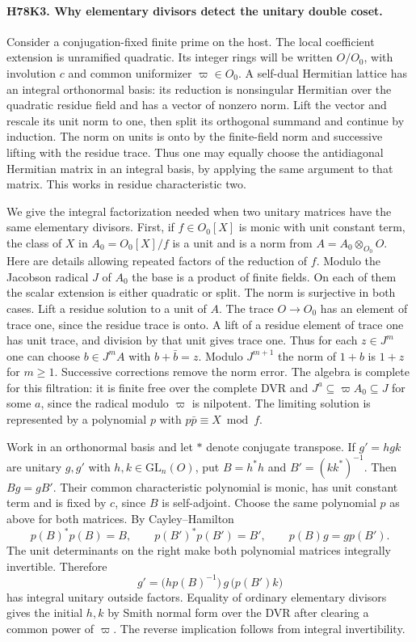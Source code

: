 \paragraph{H78K3. Why elementary divisors detect the unitary double coset.}
Consider a conjugation-fixed finite prime on the host. The local
coefficient extension is unramified quadratic. Its integer rings
will be written $O/O_0$, with involution $c$ and common uniformizer
$\varpi\in O_0$. A self-dual Hermitian lattice has an integral
orthonormal basis: its reduction is nonsingular Hermitian over
the quadratic residue field and has a vector of nonzero norm.
Lift the vector and rescale its unit norm to one, then split its
orthogonal summand and continue by induction. The norm on units
is onto by the finite-field norm and successive lifting with the
residue trace. Thus one may equally choose the antidiagonal
Hermitian matrix in an integral basis, by applying the same argument
to that matrix. This works in residue characteristic two.

We give the integral factorization needed when two unitary matrices
have the same elementary divisors. First, if $f\in O_0[X]$ is monic
with unit constant term, the class of $X$ in $A_0=O_0[X]/f$ is
a unit and is a norm from $A=A_0\otimes_{O_0}O$. Here are details
allowing repeated factors of the reduction of $f$. Modulo the
Jacobson radical $J$ of $A_0$ the base is a product of finite fields.
On each of them the scalar extension is either quadratic or split.
The norm is surjective in both cases. Lift a residue solution to a
unit of $A$. The trace $O\to O_0$ has an element of trace one,
since the residue trace is onto. A lift of a residue element of trace
one has unit trace, and division by that unit gives trace one. Thus for each $z\in J^m$ one can choose
$b\in J^m A$ with $b+\bar b=z$. Modulo $J^{m+1}$ the norm
of $1+b$ is $1+z$ for $m\ge1$. Successive corrections remove the
norm error. The algebra is complete for this filtration: it is
finite free over the complete DVR and $J^a\subseteq\varpi A_0
\subseteq J$ for some $a$, since the radical modulo $\varpi$
is nilpotent. The limiting solution is represented by a polynomial
$p$ with $p\bar p\equiv X\bmod f$.

Work in an orthonormal basis and let $*$ denote conjugate transpose.
If $g'=hgk$ are unitary $g,g'$ with $h,k\in\mathrm{GL}_n(O)$,
put $B=h^*h$ and $B'=(kk^*)^{-1}$. Then $Bg=gB'$.
Their common characteristic polynomial is monic, has unit constant
term and is fixed by $c$, since $B$ is self-adjoint. Choose the
same polynomial $p$ as above for both matrices. By Cayley--Hamilton
\[
 p(B)^*p(B)=B,\qquad p(B')^*p(B')=B',\qquad p(B)g=g p(B').
\]
The unit determinants on the right make both polynomial matrices
integrally invertible. Therefore
\[
   g'=\bigl(hp(B)^{-1}\bigr)\,g\,\bigl(p(B')k\bigr)
\]
has integral unitary outside factors. Equality of ordinary
elementary divisors gives the initial $h,k$ by Smith normal form
over the DVR after clearing a common power of $\varpi$.
The reverse implication follows from integral invertibility.

